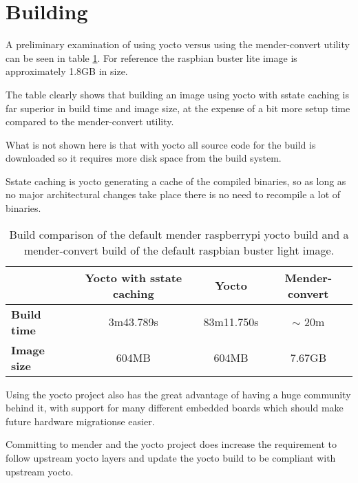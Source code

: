 \documentclass[../../main.tex]{subfiles}
\begin{document}
\section{Building}%
\label{sec:building}

A preliminary examination of using yocto versus using the mender-convert utility can be seen
in table \ref{tab:build_comp}. For reference the raspbian buster lite image is approximately
1.8GB in size.

The table clearly shows that building an image using yocto with sstate caching is far superior
in build time and image size, at the expense of a bit more setup time compared to the
mender-convert utility.

What is not shown here is that with yocto all source code for the build is downloaded so it
requires more disk space from the build system.

Sstate caching is yocto generating a cache of the compiled binaries, so as long as no major
architectural changes take place there is no need to recompile a lot of binaries.


\begin{table}[h]
	\centering
	\caption{
		Build comparison of the default mender raspberrypi yocto build and a mender-convert build
		of the default raspbian buster light image.
	}
	\label{tab:build_comp}
	\begin{tabular}{l|ccc}
		& \textbf{Yocto with sstate caching}& \textbf{Yocto} & \textbf{Mender-convert}\\
		\hline
		\textbf{Build time}&3m43.789s&83m11.750s& $\sim$ 20m \\
		\textbf{Image size}&604MB&604MB&7.67GB\\
	\end{tabular}
\end{table}



Using the yocto project also has the great advantage of having a huge community behind it, with support for many different embedded boards which should make future hardware migrationse easier.

Committing to mender and the yocto project does increase the requirement to follow upstream
yocto layers and update the yocto build to be compliant with upstream yocto.
\end{document}

